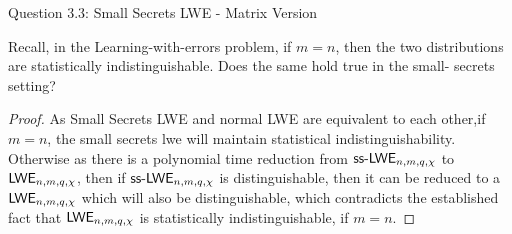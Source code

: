 \begin{solution}{Question 3.3: Small Secrets LWE - Matrix Version}\label{ques:33}
    \begin{question}
    Recall, in the Learning-with-errors problem, if $m = n$, then the two distributions are statistically indistinguishable. Does the same hold true in the small- secrets setting?
    \end{question}
    \tcblower{}
    \begin{proof}
    As Small Secrets LWE and normal LWE are equivalent to each other,if $m=n$, the small secrets lwe will maintain statistical indistinguishability. Otherwise as there is a polynomial time reduction from $\mathsf{ss\text{-}LWE}_{n,m,q,\chi}$ to $\mathsf{LWE}_{n,m,q,\chi}$, then if $\mathsf{ss\text{-}LWE}_{n,m,q,\chi}$ is distinguishable, then it can be reduced to a $\mathsf{LWE}_{n,m,q,\chi}$ which will also be distinguishable, which contradicts the established fact that $\mathsf{LWE}_{n,m,q,\chi}$ is statistically indistinguishable, if $m=n$.
    \end{proof}
\end{solution}
